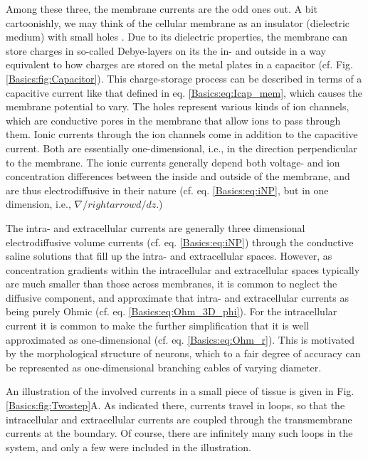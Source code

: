 Among these three, the membrane currents are the odd ones out. A bit cartoonishly, we may think of the cellular membrane as an insulator (dielectric medium) with small holes . Due to its dielectric properties, the membrane can store charges in so-called Debye-layers on its the in- and outside in a way equivalent to how charges are stored on the metal plates in a capacitor (cf. Fig.\ref{Basics:fig:Capacitor}). This charge-storage process can be described in terms of a capacitive current like that defined in eq. \ref{Basics:eq:Icap_mem}, which causes the membrane potential to vary. The holes represent various kinds of ion channels, which are conductive pores in the membrane that allow ions to pass through them. Ionic currents through the ion channels come in addition to the capacitive current. Both are essentially one-dimensional, i.e., in the direction perpendicular to the membrane. The ionic currents generally depend both voltage- and ion concentration differences between the inside and outside of the membrane, and are thus electrodiffusive in their nature (cf. eq. \ref{Basics:eq:iNP}, but in one dimension, i.e., $\nabla /rightarrow d/dz$.) 

The intra- and extracellular currents are generally three dimensional electrodiffusive volume currents (cf. eq. \ref{Basics:eq:iNP}) through the conductive saline solutions that fill up the intra- and extracellular spaces. However, as concentration gradients within the intracellular and extracellular spaces typically are much smaller than those across membranes, it is common to neglect the diffusive component, and approximate that intra- and extracellular currents as being purely Ohmic (cf. eq. \ref{Basics:eq:Ohm_3D_phi}). For the intracellular current it is common to make the further simplification that it is well approximated as one-dimensional (cf. eq. \ref{Basics:eq:Ohm_r}). This is motivated by the morphological structure of neurons, which to a fair degree of accuracy can be represented as one-dimensional branching cables of varying diameter.

An illustration of the involved currents in a small piece of tissue is given in Fig. \ref{Basics:fig:Twostep}A. As indicated there, currents travel in loops, so that the intracellular and extracellular currents are coupled through the transmembrane currents at the boundary. Of course, there are infinitely many such loops in the system, and only a few were included in the illustration. 

